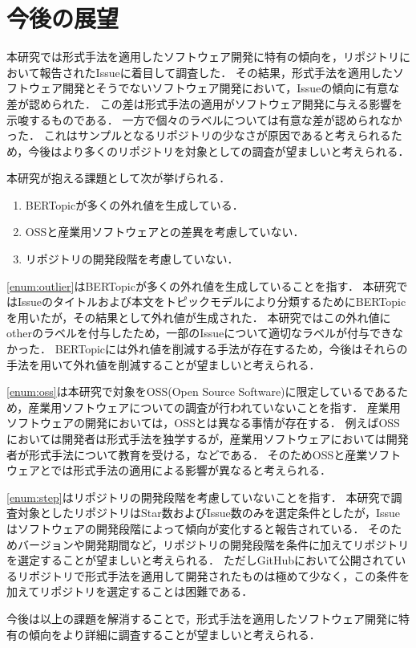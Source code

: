 \documentclass[main]{subfiles}
\begin{document}
\chapter{今後の展望}

本研究では形式手法を適用したソフトウェア開発に特有の傾向を，リポジトリにおいて報告されたIssueに着目して調査した．
その結果，形式手法を適用したソフトウェア開発とそうでないソフトウェア開発において，Issueの傾向に有意な差が認められた．
この差は形式手法の適用がソフトウェア開発に与える影響を示唆するものである．
一方で個々のラベルについては有意な差が認められなかった．
これはサンプルとなるリポジトリの少なさが原因であると考えられるため，今後はより多くのリポジトリを対象としての調査が望ましいと考えられる．

本研究が抱える課題として次が挙げられる．

\begin{enumerate}[label=課題\arabic*.]
	\item \label{enum:outlier} BERTopicが多くの外れ値を生成している．
	\item \label{enum:oss} OSSと産業用ソフトウェアとの差異を考慮していない．
	\item \label{enum:step} リポジトリの開発段階を考慮していない．
\end{enumerate}

\ref{enum:outlier}はBERTopicが多くの外れ値を生成していることを指す．
本研究ではIssueのタイトルおよび本文をトピックモデルにより分類するためにBERTopicを用いたが，その結果として外れ値が生成された．
本研究ではこの外れ値にotherのラベルを付与したため，一部のIssueについて適切なラベルが付与できなかった．
BERTopicには外れ値を削減する手法が存在するため，今後はそれらの手法を用いて外れ値を削減することが望ましいと考えられる．

\ref{enum:oss}は本研究で対象をOSS(Open Source Software)に限定しているであるため，産業用ソフトウェアについての調査が行われていないことを指す．
産業用ソフトウェアの開発においては，OSSとは異なる事情が存在する．
例えばOSSにおいては開発者は形式手法を独学するが，産業用ソフトウェアにおいては開発者が形式手法について教育を受ける，などである．
そのためOSSと産業ソフトウェアとでは形式手法の適用による影響が異なると考えられる．

\ref{enum:step}はリポジトリの開発段階を考慮していないことを指す．
本研究で調査対象としたリポジトリはStar数およびIssue数のみを選定条件としたが，Issueはソフトウェアの開発段階によって傾向が変化すると報告されている\cite{bissyande:2013}．
そのためバージョンや開発期間など，リポジトリの開発段階を条件に加えてリポジトリを選定することが望ましいと考えられる．
ただしGitHubにおいて公開されているリポジトリで形式手法を適用して開発されたものは極めて少なく，この条件を加えてリポジトリを選定することは困難である．

今後は以上の課題を解消することで，形式手法を適用したソフトウェア開発に特有の傾向をより詳細に調査することが望ましいと考えられる．
\end{document}
